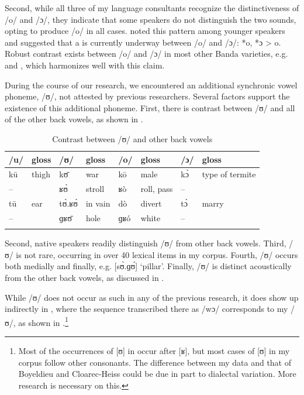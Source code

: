 \documentclass[output=paper,colorlinks,citecolor=brown]{langscibook}
\begin{document}
Second, while all three of my language consultants recognize the distinctiveness of /o/ and /ɔ/, they indicate that some  speakers do not distinguish the two sounds, opting to produce /o/ in all cases. \citet[9]{Théret-Kieschke1998} noted this pattern among younger speakers and suggested that a  is currently underway between /o/ and /ɔ/: *o, *ɔ > o. Robust contrast exists between /o/ and /ɔ/ in most other Banda  varieties, e.g.  \citep{BoyeldieuCloarec-Heiss2001} and  \citep{Olson2005}, which harmonizes well with this claim.

During the course of our research, we encountered an additional synchronic vowel phoneme, /ʊ/, not attested by previous researchers. Several factors support the existence of this additional phoneme. First, there is contrast between /ʊ/ and all of the other back vowels, as shown in .

\begin{table}
\caption{Contrast between /ʊ/ and other back vowels}
\label{tab:olson:8}
    \begin{tabularx}{\textwidth}{ll@{~~~~~~~~~}ll@{~~~~~~~~~}ll@{~~~~~~~~~}ll}
    \lsptoprule
        /u/     & gloss & /ʊ/ & gloss & /o/ & gloss & /ɔ/ & gloss\\
    \midrule
        kū      & thigh & kʊ̄ & war & kō & male & kɔ̀ & type of termite\\
        --     & & ʁʊ̀ & stroll & ʁò & roll, pass & -- & \\
        tū      & ear & tʊ̀.ʁʊ̀ & in vain & dò & divert & tɔ̀ & marry\\
        --     & & ɡʁʊ̄ & hole & ɡʁó & white & -- & \\
    \lspbottomrule
    \end{tabularx}
\end{table}

Second, native speakers readily distinguish /ʊ/ from other back vowels. Third, /ʊ/ is not rare, occurring in over 40 lexical items in my corpus. Fourth, /ʊ/ occurs both medially and finally, e.g. [sʊ̀.ɡʊ́] ‘pillar’. Finally, /ʊ/ is distinct acoustically from the other back vowels, as discussed in .

While /ʊ/ does not occur as such in any of the previous research, it does show up indirectly in \citet{BoyeldieuCloarec-Heiss2001}, where the sequence transcribed there as /wɔ/ corresponds to my /ʊ/, as shown in .\footnote{Most of the occurrences of [ʊ] in  occur after [ʁ], but most cases of [ʊ] in my corpus follow other consonants. The difference between my data and that of Boyeldieu and Cloarec-Heiss could be due in part to dialectal variation. More research is necessary on this.}
\end{document}
